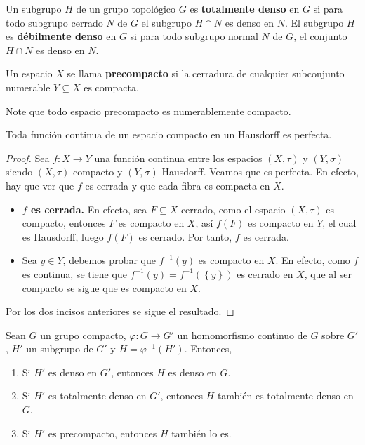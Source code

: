 \documentclass[12pt]{report}
\theoremstyle{largebreak}
\newcommand\cf[3]{\ensuremath{#1:#2\rightarrow#3}}
\begin{document}
    \begin{mydef}
        Un subgrupo $H$ de un grupo topológico $G$ es \textbf{totalmente denso} en $G$ si para todo subgrupo cerrado $N$ de $G$ el subgrupo $H\cap N$ es denso en $N$. El subgrupo $H$ es \textbf{débilmente denso} en $G$ si para todo subgrupo normal $N$ de $G$, el conjunto $H\cap N$ es denso en $N$.
    \end{mydef}

    \begin{mydef}
        Un espacio $X$ se llama \textbf{precompacto} si la cerradura de cualquier subconjunto numerable $Y\subseteq X$ es compacta.
    \end{mydef}

    \begin{obs}
        Note que todo espacio precompacto es numerablemente compacto.
    \end{obs}

    \begin{lema}
        Toda función continua de un espacio compacto en un Hausdorff es perfecta.
    \end{lema}

    \begin{proof}
        Sea $\cf{f}{X}{Y}$ una función continua entre los espacios $(X,\tau)$ y $(Y,\sigma)$ siendo $(X,\tau)$ compacto y $(Y,\sigma)$ Hausdorff. Veamos que es perfecta. En efecto, hay que ver que $f$ es cerrada y que cada fibra es compacta en $X$.
        \begin{itemize}
            \item \textbf{$f$ es cerrada.} En efecto, sea $F\subseteq X$ cerrado, como el espacio $(X,\tau)$ es compacto, entonces $F$ es compacto en $X$, así $f(F)$ es compacto en $Y$, el cual es Hausdorff, luego $f(F)$ es cerrado. Por tanto, $f$ es cerrada.
            \item Sea $y\in Y$, debemos probar que $f^{-1}(y)$ es compacto en $X$. En efecto, como $f$ es continua, se tiene que $f^{-1}(y)=f^{-1}(\left\{y\right\})$ es cerrado en $X$, que al ser compacto se sigue que es compacto en $X$.
        \end{itemize}
        Por los dos incisos anteriores se sigue el resultado.
    \end{proof}

    \begin{propo}
        Sean $G$ un grupo compacto, $\cf{\varphi}{G}{G'}$ un homomorfismo continuo de $G$ sobre $G'$, $H'$ un subgrupo de $G'$ y $H=\varphi^{-1}(H')$. Entonces,
        \begin{enumerate}
            \item Si $H'$ es denso en $G'$, entonces $H$ es denso en $G$.
            \item Si $H'$ es totalmente denso en $G'$, entonces $H$ también es totalmente denso en $G$.
            \item Si $H'$ es precompacto, entonces $H$ también lo es.
        \end{enumerate}
    \end{propo}
\end{document}
